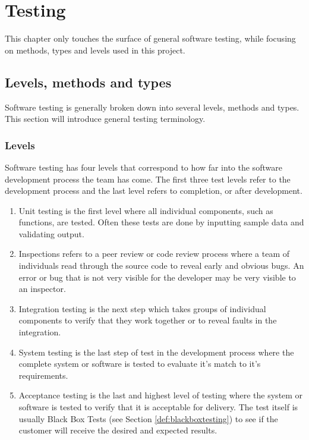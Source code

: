\chapter{Testing}
This chapter only touches the surface of general software testing, while focusing on methods, types and levels used in this project.
\section{Levels, methods and types}
Software testing is generally broken down into several levels, methods and types. This section will introduce general testing terminology.
\subsection{Levels}
Software testing has four levels that correspond to how far into the software development process the team has come. The first three test levels refer to the development process and the last level refers to completion, or after development.
\begin{enumerate}
\item Unit testing is the first level where all individual components, such as functions, are tested. Often these tests are done by inputting sample data and validating output.
\item Inspections refers to a peer review or code review process where a team of individuals read through the source code to reveal early and obvious bugs. An error or bug that is not very visible for the developer may be very visible to an inspector.
\item Integration testing is the next step which takes groups of individual components to verify that they work together or to reveal faults in the integration.
\item System testing is the last step of test in the development process where the complete system or software is tested to evaluate it's match to it's requirements.
\item Acceptance testing is the last and highest level of testing where the system or software is tested to verify that it is acceptable for delivery. The test itself is usually Black Box Tests (see Section \ref{def:blackboxtesting}) to see if the customer will receive the desired and expected results.
\end{enumerate}
